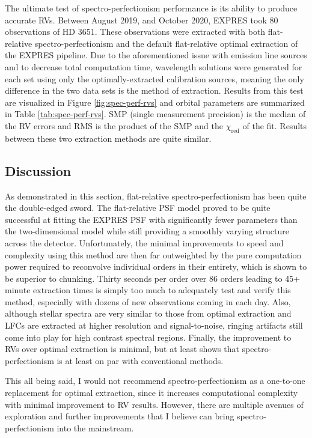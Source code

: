 The ultimate test of spectro-perfectionism performance is its ability to produce accurate RVs. Between August 2019, and October 2020, EXPRES took 80 observations of HD 3651. These observations were extracted with both flat-relative spectro-perfectionism and the default flat-relative optimal extraction of the EXPRES pipeline. Due to the aforementioned issue with emission line sources and to decrease total computation time, wavelength solutions were generated for each set using only the optimally-extracted calibration sources, meaning the only difference in the two data sets is the method of extraction. Results from this test are visualized in Figure \ref{fig:spec-perf-rvs} and orbital parameters are summarized in Table \ref{tab:spec-perf-rvs}. SMP (single measurement precision) is the median of the RV errors and RMS is the product of the SMP and the $\chi_\mathrm{red}$ of the fit. Results between these two extraction methods are quite similar.

\subsection{Discussion}

As demonstrated in this section, flat-relative spectro-perfectionism has been quite the double-edged sword. The flat-relative PSF model proved to be quite successful at fitting the EXPRES PSF with significantly fewer parameters than the two-dimensional model while still providing a smoothly varying structure across the detector. Unfortunately, the minimal improvements to speed and complexity using this method are then far outweighted by the pure computation power required to reconvolve individual orders in their entirety, which is shown to be superior to chunking. Thirty seconds per order over 86 orders leading to 45+ minute extraction times is simply too much to adequately test and verify this method, especially with dozens of new observations coming in each day. Also, although stellar spectra are very similar to those from optimal extraction and LFCs are extracted at higher resolution and signal-to-noise, ringing artifacts still come into play for high contrast spectral regions. Finally, the improvement to RVs over optimal extraction is minimal, but at least shows that spectro-perfectionism is at least on par with conventional methods.

This all being said, I would not recommend spectro-perfectionism as a one-to-one replacement for optimal extraction, since it increases computational complexity with minimal improvement to RV results. However, there are multiple avenues of exploration and further improvements that I believe can bring spectro-perfectionism into the mainstream.

